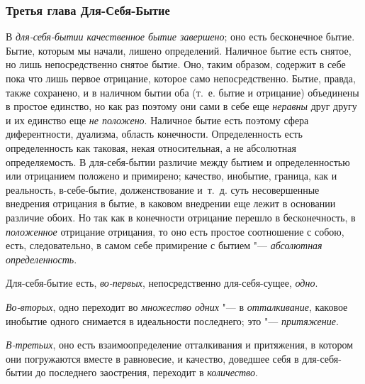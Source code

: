 \subsubsection[Третья главаДля{}-Себя{}-Бытие]{Третья глава\newline
Для-Себя-Бытие}
В {\em для-себя-бытии качественное бытие завершено}; оно
есть бесконечное бытие. Бытие, которым мы начали, лишено определений.
Наличное бытие есть снятое, но лишь непосредственно снятое бытие. Оно,
таким образом, содержит в себе пока что лишь первое отрицание, которое само
непосредственно. Бытие, правда, также сохранено, и в наличном бытии оба
(т.~е. бытие и отрицание) объединены в простое единство, но как раз поэтому
они сами в себе еще {\em неравны} друг другу и их
единство еще {\em не положено}. Наличное бытие есть
поэтому сфера диферентности, дуализма, область конечности. Определенность
есть определенность как таковая, некая относительная, а не абсолютная
определяемость. В для-себя-бытии различие между бытием и определенностью
или отрицанием положено и примирено; качество, инобытие, граница, как и
реальность, в-себе-бытие, долженствование и~т.~д. суть несовершенные
внедрения отрицания в бытие, в каковом внедрении еще лежит в основании
различие обоих. Но так как в конечности отрицание перешло в бесконечность,
в {\em положенное} отрицание отрицания, то оно есть
простое соотношение с собою, есть, следовательно, в самом себе примирение с
бытием "--- {\em абсолютная определенность}.

Для-себя-бытие есть, {\em во-первых}, непосредственно
для-себя-сущее, {\em одно}.

{\em Во-вторых}, одно переходит во
{\em множество одних} "--- в
{\em отталкивание}, каковое инобытие одного снимается в
идеальности последнего; это "--- {\em притяжение}.

{\em В-третьих}, оно есть взаимоопределение отталкивания
и притяжения, в котором они погружаются вместе в равновесие, и качество,
доведшее себя в для-себя-бытии до последнего заострения, переходит в
{\em количество}.

